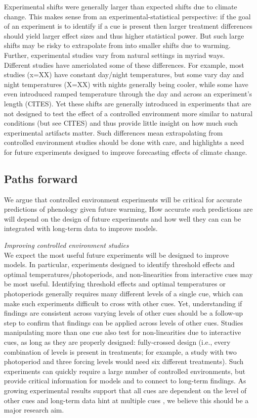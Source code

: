 \documentclass[11pt,letter]{article}
\begin{document}
Experimental shifts were generally larger than expected shifts due to climate change. This makes sense from an experimental-statistical perspective: if the goal of an experiment is to identify if a cue is present then larger treatment differences should yield larger effect sizes and thus higher statistical power. But such large shifts may be risky to extrapolate from into smaller shifts due to warming. Further, experimental studies vary from natural settings in myriad ways. Different studies have ameriolated some of these differences. For example, most studies (x=XX) have constant day/night temperatures, but some vary day and night temperatures (X=XX) with nights generally being cooler, while some have even introduced ramped temperature through the day and across an experiment's length (CITES). Yet these shifts are generally introduced in experiments that are not designed to test the effect of a controlled environment more similar to natural conditions (but see CITES) and thus provide little insight on how much such experimental artifacts matter. Such differences mean extrapolating from controlled environment studies should be done with care, and highlights a need for future experiments designed to improve forecasting effects of climate change. 

\subsection{Paths forward}
We argue that controlled environment experiments will be critical for accurate predictions of phenology given future warming, How accurate such predictions are will depend on the design of future experiments and how well they can can be integrated with long-term data to improve models. 

\emph{Improving controlled environment studies}\\
We expect the most useful future experiments will be designed to improve models. In particular, experiments designed to identify threshold effects and optimal temperatures/photoperiods, and non-linearities from interactive cues may be most useful. Identifying threshold effects and optimal temperatures or photoperiods generally requires many different levels of a single cue, which can make such experiments difficult to cross with other cues. Yet, understanding if findings are consistent across varying levels of other cues should be a follow-up step to confirm that findings can be applied across levels of other cues. Studies manipulating more than one cue also test for non-linearities due to interactive cues, as long as they are properly designed: fully-crossed design (i.e., every combination of levels is present in treatments; for example, a study with two photoperiod and three forcing levels would need six different treatments). Such experiments can quickly require a large number of controlled environments, but provide critical information for models and to connect to long-term findings. As growing experimental results support that all cues are dependent on the level of other cues \citep{flynn2018} and long-term data hint at multiple cues \citep{fu2015}, we believe this should be a major research aim.
\end{document}
